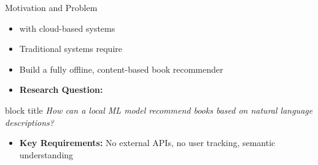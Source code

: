 \begin{frame}{Motivation and Problem}
\begin{itemize}
  \item {} with cloud-based systems
  \item Traditional systems require 
  \item {} Build a fully offline, content-based book recommender
  \vspace{0.1cm}
  \item \textbf{Research Question:}
\end{itemize}

\begin{center}
\begin{beamercolorbox}[sep=5pt,center,rounded=true]{block title}
\footnotesize \textit{How can a local ML model recommend books based on natural language descriptions?}
\end{beamercolorbox}
\end{center}

\vspace{0.2cm}
\begin{itemize}
  \item \textbf{Key Requirements:} No external APIs, no user tracking, semantic understanding
\end{itemize}

  


\end{frame}
